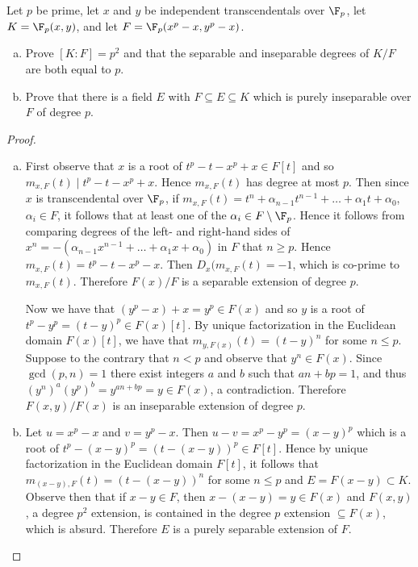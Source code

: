 \documentclass[10pt]{amsart}
\begin{document}
\begin{thm}
  Let $p$ be prime, let $x$ and $y$ be independent transcendentals over $\F_p$, let $K = \F_p(x,y)$, and let $F = \F_p(x^p - x, y^p - x)$.
  \begin{enumerate}[(a)]
  \item
    Prove $[K : F] = p^2$ and that the separable and inseparable degrees of $K/F$ are both equal to $p$.
  \item
    Prove that there is a field $E$ with $F \subseteq E \subseteq K$ which is purely inseparable over $F$ of degree $p$.
  \end{enumerate}

  \begin{proof}
    \begin{enumerate}[(a)]
    \item
      First observe that $x$ is a root of $t^p - t - x^p + x \in F[t]$ and so $m_{x, F}(t) \mid t^p - t - x^p + x$.
      Hence $m_{x, F}(t)$ has degree at most $p$.
      Then since $x$ is transcendental over $\F_p$, if $m_{x, F}(t) = t^n + \alpha_{n-1}t^{n-1} + \ldots + \alpha_1 t + \alpha_0$, $\alpha_i \in F$, it follows that at least one of the $\alpha_i \in F \setminus \F_p$.
      Hence it follows from comparing degrees of the left- and right-hand sides of $x^n = -(\alpha_{n-1}x^{n-1} + \ldots + \alpha_1 x + \alpha_0)$ in $F$ that $n \geq p$.
      Hence $m_{x, F}(t) = t^p - t - x^p - x$.
      Then $D_x(m_{x,F}(t) = -1$, which is co-prime to $m_{x,F}(t)$.
      Therefore $F(x)/F$ is a separable extension of degree $p$.
      
      Now we have that $(y^p - x) + x = y^p \in F(x)$ and so $y$ is a root of $t^p - y^p = (t - y)^p \in F(x)[t]$.
      By unique factorization in the Euclidean domain $F(x)[t]$, we have that $m_{y, F(x)}(t) = (t - y)^n$ for some $n \leq p$.
      Suppose to the contrary that $n < p$ and observe that $y^n \in F(x)$.
      Since $\gcd(p,n) = 1$ there exist integers $a$ and $b$ such that $an + bp = 1$, and thus $(y^n)^a(y^p)^b = y^{an + bp} = y \in F(x)$, a contradiction.
      Therefore $F(x,y)/F(x)$ is an inseparable extension of degree $p$. 
    \item
      Let $u = x^p - x$ and $v = y^p - x$.
      Then $u - v = x^p - y^p = (x - y)^p$ which is a root of $t^p - (x - y)^p = (t - (x - y))^p \in F[t]$.
      Hence by unique factorization in the Euclidean domain $F[t]$, it follows that $m_{(x-y), F}(t) = (t - (x - y))^n$ for some $n \leq p$ and $E = F(x - y) \subset K$.
      Observe then that if $x - y \in F$, then $x - (x - y) = y \in F(x)$ and $F(x,y)$, a degree $p^2$ extension, is contained in the degree $p$ extension $\subseteq F(x)$, which is absurd.
      Therefore $E$ is a purely separable extension of $F$.
    \end{enumerate}
  \end{proof}
\end{thm}
\end{document}
